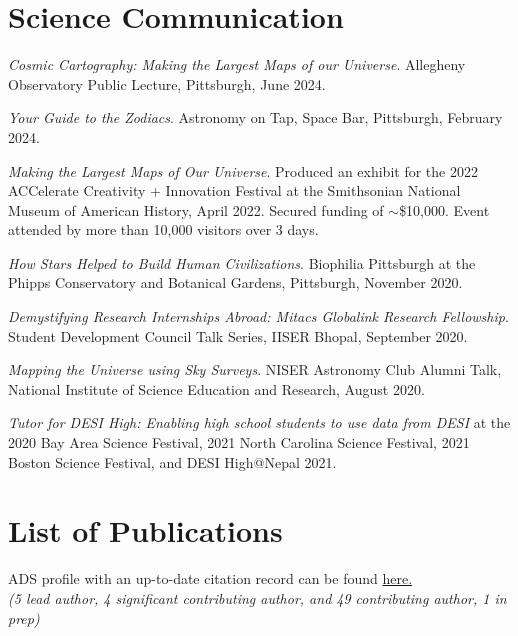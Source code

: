 \documentclass[10pt,a4paper,roman,]{moderncv} %
\begin{document}
\section{Science Communication}

 \begin{etaremune}[leftmargin=40pt,labelsep=10pt]
 \item \textit{Cosmic Cartography: Making the Largest Maps of our Universe}. Allegheny Observatory Public Lecture, Pittsburgh, June 2024.
 \item \textit{Your Guide to the Zodiacs}. Astronomy on Tap, Space Bar, Pittsburgh, February 2024.
 \item \textit{Making the Largest Maps of Our Universe}. Produced an exhibit for the 2022 ACCelerate Creativity + Innovation Festival at the Smithsonian National Museum of American History, April 2022. Secured funding of $\sim$\$10,000. Event attended by more than 10,000 visitors over 3 days. 
 \item \textit{How Stars Helped to Build Human Civilizations}. Biophilia Pittsburgh at the Phipps Conservatory and Botanical Gardens, Pittsburgh, November 2020.
\item \textit{Demystifying Research Internships Abroad: Mitacs Globalink Research Fellowship}. Student Development
Council Talk Series, IISER Bhopal, September 2020.
\item \textit{Mapping the Universe using Sky Surveys}. NISER Astronomy Club Alumni Talk, National Institute of Science Education and Research, August 2020.
\item \textit{Tutor for DESI High: Enabling high school students to use data from DESI} at the 2020 Bay Area Science Festival, 2021 North Carolina Science Festival, 2021 Boston Science Festival, and DESI High@Nepal 2021.
\end{etaremune}

\clearpage
\section{List of Publications}
\begin{center}
ADS profile with an up-to-date citation record can be found \href{https://ui.adsabs.harvard.edu/search/p_=0&q=orcid\%3A0000-0002-5665-7912&sort=date\%20desc\%2C\%20bibcode\%20desc}{here.} \\
    \textit{(5 lead author, 4 significant contributing author, and 49 contributing author, 1 in prep)\\}
    
    

\end{center}
\end{document}
